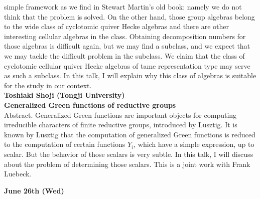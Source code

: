 \documentclass[12pt,landscape]{jarticle}
\begin{document}
simple framework as we find in Stewart Martin's old book: namely we do not think that the problem is solved. On the other hand, those group algebras belong to the wide class of cyclotomic quiver Hecke algebras and there are other interesting cellular algebras in the class. Obtaining decomposition numbers for those algebras is difficult again, but we may find a subclass, and we expect that we may tackle the difficult problem in the subclass. We claim that the class of cyclotomic cellular quiver Hecke algebras of tame representation type may serve as such a subclass. In this talk, I will explain why this class of algebras is suitable for the study in our context. 
\\[5mm]
{\bf\large Toshiaki Shoji (Tongji University)} \\
{\bf Generalized Green functions of reductive groups} \\[1mm]
Abstract. 
Generalized Green functions are important objects for computing 
irreducible characters of finite reductive groups, introduced by Lusztig. 
It is known by Lusztig that the computation of generalized Green functions 
is reduced to the computation of certain functions $Y_i$, 
which have a simple expression, up to scalar. 
But the behavior of those scalars is very subtle. 
In this talk, I will discuss about the problem of determining those scalars.   
This is a joint work with Frank Luebeck. 
\\
\hrulefill


\begin{center}
{\bf\Large June 26th (Wed)}
\end{center}
\end{document}
